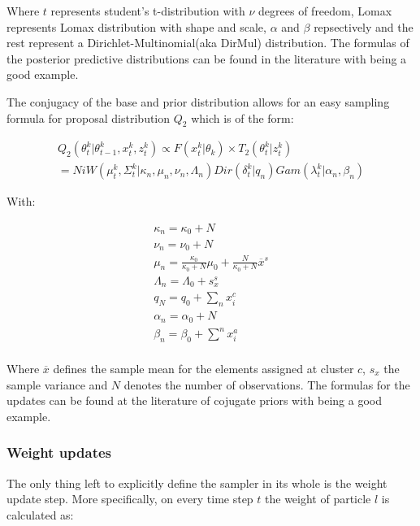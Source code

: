 \documentclass[twoside,hidelinks]{article}
\begin{document}
Where $t$ represents student's t-distribution with $\nu$ degrees of freedom, Lomax represents Lomax distribution with shape and scale, $\alpha$ and $\beta$ repsectively and the rest represent a Dirichlet-Multinomial(aka DirMul) distribution. The formulas of the posterior predictive distributions can be found in the literature with \cite{compendium} being a good example. 

The conjugacy of the base and prior distribution allows for an easy sampling formula for proposal distribution $Q_2$ which is of the form: 


\begin{equation} \label{Q_2}
\begin{split}
Q_2(\theta_t^k | \theta_{t-1}^k , x_t^k, z_t^k) \propto F( x_t^k | \theta_k) \times T_2(\theta_t^k | z_t^k) \\
= NiW( \mu_t^k, \Sigma_t^k | \kappa_n, \mu_n, \nu_n, \Lambda_n ) Dir(\delta_t^k | q_n) Gam(\lambda_t^k | \alpha_n, \beta_n)
\end{split}
\end{equation}

With:

\begin{equation} \label{udpates}
\begin{split}
\kappa_n = \kappa_0 + N \\
\nu_n = \nu_0 + N \\
\mu_n = \frac{\kappa_0}{\kappa_0 + N} \mu_0 +  \frac{N}{\kappa_0 + N} \overline{x}^s\\
\Lambda_n = \Lambda_0 + s_{x}^s\\
q_N = q_0 +  \sum_n x_i^c\\
\alpha_n = \alpha_0 +  N\\
\beta_n = \beta_0 +  \sum^n x_i^a\\
\end{split}
\end{equation}


Where $\overline{x}$ defines the sample mean for the elements assigned at cluster $c$, $s_{x}$ the sample variance and $N$ denotes the number of observations. The formulas for the updates can be found at the literature of cojugate priors with\cite{conjugate} being a good example.

\subsubsection{Weight updates}

The only thing left to explicitly define the sampler in its whole is the weight update step. More specifically, on every time step $t$ the weight of particle $l$ is calculated as:
\end{document}
